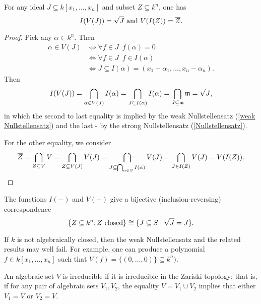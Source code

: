 \begin{theorem}
  \label{algebraic set nullstellensatz}
  For any ideal \(J \subseteq k[x_1, \dotsc, x_n]\) and subset \(Z \subseteq k^n\), one has
  \[I(V(J)) = \sqrt{J} \text{ and } V(I(Z)) = \overline{Z}.\]
\end{theorem}
\begin{proof}
  Pick any \(\alpha \in k^n.\) Then
  \begin{align*}
    \alpha \in V(J) & \iff \forall f \in J \enspace f(\alpha) = 0 \\
                    & \iff \forall f \in J \enspace f \in I(\alpha) \\
                    & \iff J \subseteq I(\alpha) = (x_1 - \alpha_1, \dotsc, x_n - \alpha_n).
  \end{align*}
  Then
  \[I(V(J)) = \bigcap_{\alpha \in V(J)} I(\alpha) = \bigcap_{J \subseteq I(\alpha)} I(\alpha) = \bigcap_{J \subseteq \mathfrak m} \mathfrak m = \sqrt{J},\]
  in which the second to last equality is implied by the weak Nullstellensatz (\cref{weak Nullstellensatz}) and the last - by the strong Nullstellensatz (\cref{Nullstellensatz}).

  For the other equality, we consider
  \[\overline{Z} = \bigcap_{Z \subseteq V} V = \bigcap_{Z \subseteq V(J)} V(J) = \bigcap_{J \subseteq \bigcap_{\alpha \in Z} I(\alpha)} V(J) = \bigcap_{J \in I(Z)} V(J) = V(I(Z)).\]
\end{proof}

\begin{corollary}
  \label{closed in bijection with radical}
  The functions \(I(-)\) and \(V(-)\) give a bijective (inclusion-reversing) correspondence
  \[\{Z \subseteq k^n, \text{$Z$ closed}\} \cong \{J \subseteq S \mathrel{|} \sqrt{J} = J\}.\]
\end{corollary}

\begin{note}
  If \(k\) is not algebraically closed, then the weak Nullstellensatz and the related results may well fail. For example, one can produce a polynomial \(f \in k[x_1, \dotsc, x_n]\) such that
  \(V(f) = \{(0, \dotsc, 0)\} \subseteq k^n).\)
\end{note}

\begin{df}
  An algebraic set \(V\) is irreducible if it is irreducible in the Zariski topology; that is, if for any pair of algebraic sets \(V_1, V_2\), the equality \(V = V_1 \cup V_2\) implies that either \(V_1 = V\) or \(V_2 = V.\)
\end{df}

